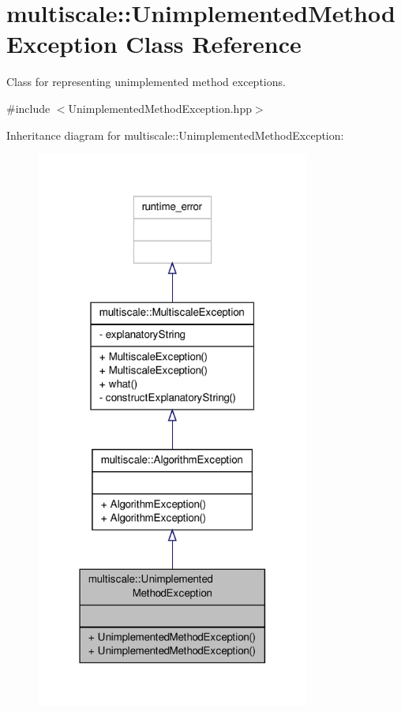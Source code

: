 \hypertarget{classmultiscale_1_1UnimplementedMethodException}{\section{multiscale\-:\-:Unimplemented\-Method\-Exception Class Reference}
\label{classmultiscale_1_1UnimplementedMethodException}
}


Class for representing unimplemented method exceptions.  




{\ttfamily \#include $<$Unimplemented\-Method\-Exception.\-hpp$>$}



Inheritance diagram for multiscale\-:\-:Unimplemented\-Method\-Exception\-:
\nopagebreak
\begin{figure}[H]
\begin{center}
\leavevmode
\includegraphics[width=256pt]{classmultiscale_1_1UnimplementedMethodException__inherit__graph}
\end{center}
\end{figure}


